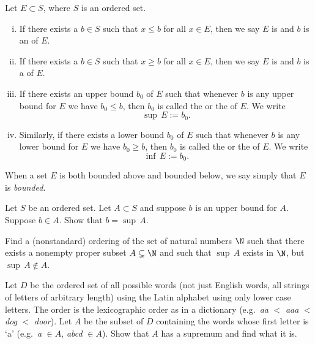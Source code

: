 \documentclass[12pt]{book}
\begin{document}
\begin{defn}\label{def:sup-inf}
Let $E \subset S$, where $S$ is an ordered set.
\begin{enumerate}[(i)]
\item If there exists a $b \in S$ such that $x \leq b$ for all $x \in E$,
then we say $E$ is \emph{} and $b$
is an \emph{} of $E$.
\item If there exists a $b \in S$ such that $x \geq b$ for all $x \in E$,
then we say $E$ is \emph{} and $b$
is a \emph{} of $E$.
\item If there exists an upper bound $b_0$ of $E$ such that whenever
$b$ is any upper bound for $E$ we have $b_0 \leq b$, then $b_0$
is called the \emph{} or
the \emph{}
of $E$.
We write
\begin{equation*}
\sup\, E := b_0  .
\end{equation*}
\item Similarly, if there exists a lower bound $b_0$ of $E$ such that whenever
$b$ is any lower bound for $E$ we have $b_0 \geq b$, then $b_0$
is called the \emph{} or
the \emph{}
of $E$.
We write
\begin{equation*}
\inf\, E := b_0  .
\end{equation*}
\end{enumerate}
\end{defn}

When a set $E$ is both bounded above and bounded below, we say simply that
$E$ is \emph{bounded}.

\begin{exercise}
Let $S$ be an ordered set.
Let $A \subset S$ and suppose 
$b$ is an upper bound for $A$.
Suppose $b \in A$.
Show
that $b = \sup\, A$.
\end{exercise}

\begin{exercise}
Find a (nonstandard) ordering of the set of natural numbers $\N$
such that there exists a nonempty proper subset $A \subsetneq \N$
and such that $\sup\, A$ exists in $\N$, but $\sup\, A \notin A$.
\end{exercise}

\begin{exercise}
Let $D$ be the ordered set of all possible words (not just English words,
all strings of letters of arbitrary length)
using the Latin alphabet using only lower case letters.
The order is the
lexicographic order as in a dictionary (e.g.\ \emph{aa} $<$ \emph{aaa} $<$ \emph{dog} $<$ \emph{door}).
Let $A$ be the subset of $D$ containing the words whose
first letter is `a' (e.g.\ \emph{a} $\in A$, \emph{abcd} $\in A$).
Show that $A$ has a supremum and find what it is.
\end{exercise}
\end{document}
